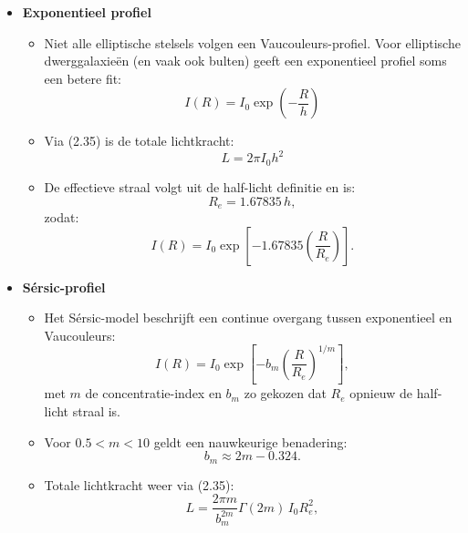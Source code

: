 \documentclass[10pt,a4paper]{article}
\renewenvironment{equation}{\begin{equation*}}{\end{equation*}}
\begin{document}
\begin{itemize}
  \item \textbf{Exponentieel profiel}
  \begin{itemize}
    \item Niet alle elliptische stelsels volgen een Vaucouleurs-profiel. Voor elliptische dwerggalaxieën (en vaak ook bulten) geeft een exponentieel profiel soms een betere fit:
    \begin{equation}
      I(R)=I_0\exp\!\left(-\frac{R}{h}\right)
      \tag{2.40}
    \end{equation}
    \item Via (2.35) is de totale lichtkracht:
    \begin{equation}
      L=2\pi I_0h^2
      \tag{2.41}
    \end{equation}
    \item De effectieve straal volgt uit de half-licht definitie en is:
    \begin{equation}
      R_e=1.67835\,h,
      \tag{2.42}
    \end{equation}
    zodat:
    \begin{equation}
      I(R)=I_0\exp\!\left[-1.67835\left(\frac{R}{R_e}\right)\right].
      \tag{2.43}
    \end{equation}
  \end{itemize}

  \item \textbf{S\'ersic-profiel}
  \begin{itemize}
    \item Het S\'ersic-model beschrijft een continue overgang tussen exponentieel en Vaucouleurs:
    \begin{equation}
      I(R)=I_0\exp\!\left[-b_m\left(\frac{R}{R_e}\right)^{1/m}\right],
      \tag{2.44}
    \end{equation}
    met $m$ de concentratie-index en $b_m$ zo gekozen dat $R_e$ opnieuw de half-licht straal is.
    \item Voor $0.5<m<10$ geldt een nauwkeurige benadering:
    \begin{equation}
      b_m \approx 2m-0.324.
      \tag{2.45}
    \end{equation}
    \item Totale lichtkracht weer via (2.35):
    \begin{equation}
      L=\frac{2\pi m}{b_m^{2m}}\Gamma(2m)\,I_0R_e^2,
      \tag{2.46}
    \end{equation}
  \end{itemize}


\end{itemize}
\end{document}

